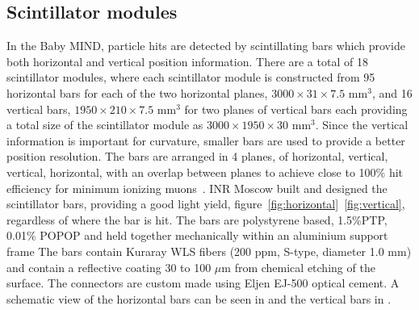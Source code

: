 \subsection{Scintillator modules}
In the Baby MIND, particle hits are detected by scintillating bars which provide both horizontal and vertical position information. There are a total of 18 scintillator modules, where each scintillator module is constructed from 95 horizontal bars for each of the two horizontal planes, $3000 \times 31 \times 7.5$ mm$^3$, and 16 vertical bars, $1950 \times 210 \times 7.5$ mm$^3$ for two planes of vertical bars each providing a total size of the scintillator module as $3000 \times 1950 \times 30$ mm$^3$. Since the vertical information is important for curvature, smaller bars are used to provide a better position resolution. The bars are arranged in 4 planes, of horizontal, vertical, vertical, horizontal, with an overlap between planes to achieve close to 100\% hit efficiency for minimum ionizing muons~\cite{51Saba}. INR Moscow built and designed the scintillator bars, providing a good light yield, figure~\ref{fig:horizontal}~\ref{fig:vertical}, regardless of where the bar is hit. The bars are polystyrene based, 1.5\%PTP, 0.01\% POPOP and held together mechanically within an aluminium support frame  The bars contain Kuraray WLS fibers (200 ppm, S-type, diameter 1.0 mm) and contain a reflective coating 30 to 100 $\mu$m from chemical etching of the surface. The connectors are custom made using Eljen EJ-500 optical cement. A schematic view of the horizontal bars can be seen in  and the vertical bars in . 




